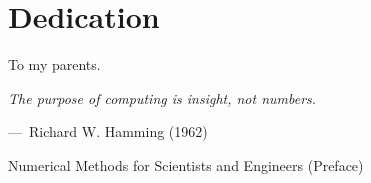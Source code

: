 
\chapter{Dedication}

To my parents.

\pagebreak
\hspace{0pt}
\vfill
\begin{epigraph}
    \emph{
        The purpose of computing is insight, not numbers.
    }
    \vspace{1em}

    ---~Richard W. Hamming (1962)

    Numerical Methods for Scientists and Engineers (Preface)
\end{epigraph}
\vfill
\hspace{0pt}
\pagebreak

